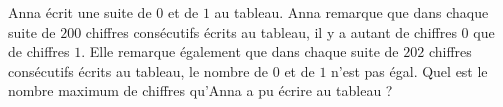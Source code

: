 Anna écrit une suite de $0$ et de $1$ au tableau. Anna remarque que dans chaque suite de $200$ chiffres consécutifs écrits au tableau, il y a autant de chiffres $0$ que de chiffres $1$. Elle remarque également que dans chaque suite de $202$ chiffres consécutifs écrits au tableau, le nombre de $0$ et de $1$ n'est pas égal. Quel est le nombre maximum de chiffres qu'Anna a pu écrire au tableau ?
